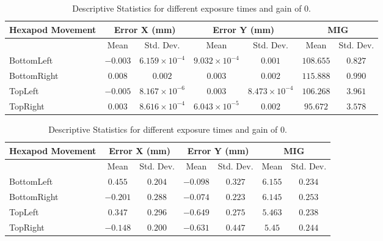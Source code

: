\begin{table}[h]
    \vspace{10pt}

    \begin{subtable}{\textwidth}
        \centering
        \footnotesize
        \begin{tabular}{lcccccc}
            \toprule
            Hexapod Movement & \multicolumn{2}{c}{Error X (mm)} & \multicolumn{2}{c}{Error Y (mm)} & \multicolumn{2}{c}{MIG}  \\
            \midrule
            & \multicolumn{1}{c}{Mean} & \multicolumn{1}{c}{Std. Dev.} & \multicolumn{1}{c}{Mean} & \multicolumn{1}{c}{Std. Dev.} & \multicolumn{1}{c}{Mean} & \multicolumn{1}{c}{Std. Dev.} \\
            \midrule
            \textsf{BottomLeft} & $-0.003$ & $6.159\times10^{-4}$ & $9.032\times10^{-4}$ & $0.001$ & $108.655$ & $0.827$ \\
            \textsf{BottomRight} & $0.008$ & $0.002$ & $0.003$ & $0.002$ & $115.888$ & $0.990$ \\
            \textsf{TopLeft} & $-0.005$ & $8.167\times10^{-6}$ & $0.003$ & $8.473\times10^{-4}$ & $106.268$ & $3.961$ \\
            \textsf{TopRight} & $0.003$ & $8.616\times10^{-4}$ & $6.043\times10^{-5}$ & $0.002$ & $95.672$ & $3.578$ \\
            \bottomrule
        \end{tabular}
        \caption{\SI{1000}{\micro\second}}
    \end{subtable}

    \vspace{10pt}

    \begin{subtable}{\textwidth}
        \centering
        \footnotesize
        \begin{tabular}{lcccccc}
            \toprule
            Hexapod Movement & \multicolumn{2}{c}{Error X (mm)} & \multicolumn{2}{c}{Error Y (mm)} & \multicolumn{2}{c}{MIG}  \\
            \midrule
            & \multicolumn{1}{c}{Mean} & \multicolumn{1}{c}{Std. Dev.} & \multicolumn{1}{c}{Mean} & \multicolumn{1}{c}{Std. Dev.} & \multicolumn{1}{c}{Mean} & \multicolumn{1}{c}{Std. Dev.} \\
            \midrule
            \textsf{BottomLeft} & $0.455$ & $0.204$ & $-0.098$ & $0.327$ & $6.155$ & $0.234$ \\
            \textsf{BottomRight} & $-0.201$ & $0.288$ & $-0.074$ & $0.223$ & $6.145$ & $0.253$ \\
            \textsf{TopLeft} & $0.347$ & $0.296$ & $-0.649$ & $0.275$ & $5.463$ & $0.238$ \\
            \textsf{TopRight} & $-0.148$ & $0.200$ & $-0.631$ & $0.447$ & $5.45$ & $0.244$ \\
            \bottomrule
        \end{tabular}
        \caption{\SI{3000}{\micro\second}}
    \end{subtable}

    \caption{Descriptive Statistics for different exposure times and gain of $0$.}
    \label{table:stats_matrix_exposuretime}
\end{table}

